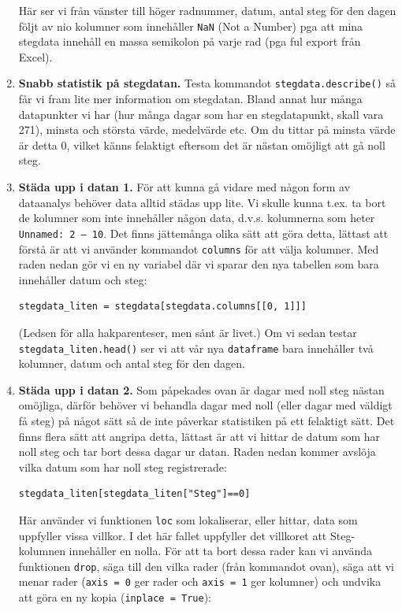 \documentclass{article}
\begin{document}
\begin{enumerate}
Här ser vi från vänster till höger radnummer, datum, antal steg för den dagen följt av nio kolumner som innehåller \verb+NaN+ (Not a Number) pga att mina stegdata innehåll en massa semikolon på varje rad (pga ful export från Excel).
\item \textbf{Snabb statistik på stegdatan.} Testa kommandot \texttt{stegdata.describe()}  så får vi fram lite mer information om stegdatan. Bland annat hur många datapunkter vi har (hur många dagar som har en stegdatapunkt, skall vara 271), minsta och största värde, medelvärde etc. Om du tittar på minsta värde är detta 0, vilket känns felaktigt eftersom det är nästan omöjligt att gå noll steg.
\item \textbf{Städa upp i datan 1.} För att kunna gå vidare med någon form av dataanalys behöver data alltid städas upp lite. Vi skulle kunna t.ex. ta bort de kolumner som inte innehåller någon data, d.v.s. kolumnerna som heter \verb+Unnamed: 2 – 10+. Det finns jättemånga olika sätt att göra detta, lättast att förstå är att vi använder kommandot \verb+columns+ för att välja kolumner. Med raden nedan gör vi en ny variabel där vi sparar den nya tabellen som bara innehåller datum och steg:
\begin{verbatim}
stegdata_liten = stegdata[stegdata.columns[[0, 1]]]
\end{verbatim}
(Ledsen för alla hakparenteser, men sånt är livet.) Om vi sedan testar \texttt{stegdata_liten.head()} ser vi att vår nya \verb+dataframe+ bara innehåller två kolumner, datum och antal steg för den dagen. 
\item \textbf{Städa upp i datan 2.} Som påpekades ovan är dagar med noll steg nästan omöjliga, därför behöver vi behandla dagar med noll (eller dagar med väldigt få steg) på något sätt så de inte påverkar statistiken på ett felaktigt sätt. Det finns flera sätt att angripa detta, lättast är att vi hittar de datum som har noll steg och tar bort dessa dagar ur datan. Raden nedan kommer avslöja vilka datum som har noll steg registrerade:
\begin{verbatim}
stegdata_liten[stegdata_liten["Steg"]==0]
\end{verbatim}
Här använder vi funktionen \verb+loc+ som lokaliserar, eller hittar, data som uppfyller vissa villkor. I det här fallet uppfyller det villkoret att Steg-kolumnen innehåller en nolla. För att ta bort dessa rader kan vi använda funktionen \verb+drop+, säga till den vilka rader (från kommandot ovan), säga att vi menar rader (\verb+axis = 0+ ger rader och \verb+axis = 1+ ger kolumner) och undvika att göra en ny kopia (\verb+inplace = True+):

\end{enumerate}
\end{document}
